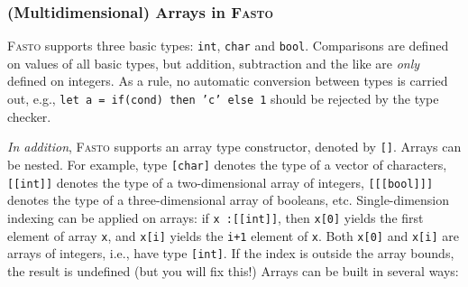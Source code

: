\documentclass[a4paper,11pt]{article}
\newcommand{\fasto}{\textsc{Fasto}\xspace}
\begin{document}
\subsubsection{(Multidimensional) Arrays in \fasto}


\fasto supports three basic types: {\tt int}, {\tt char} and {\tt bool}.
Comparisons are defined on values of all basic types, but addition, 
subtraction and the like are {\em only} defined on integers.
As a rule, %
no automatic conversion between types is carried out, e.g.,
{\tt let a = if(cond) then 'c' else 1}
should be rejected by the type checker.

{\em In addition}, \fasto supports an array type constructor, 
denoted by {\tt []}. Arrays can be nested. 
For example, type {\tt [char]} denotes the type of a
vector of characters,  {\tt [[int]]} denotes the type of a two-dimensional 
array of integers, {\tt [[[bool]]]} denotes the type of a
three-dimensional array of booleans, etc.  
%
Single-dimension indexing can be applied on arrays: if {\tt x :{}[[int]]},
then {\tt x[0]} yields the first element of array {\tt x}, and
{\tt x[i]} yields the {\tt i+1} element of {\tt x}. Both {\tt x[0]} and {\tt x[i]}
are arrays of integers, i.e., have type {\tt [int]}. If the index is outside
the array bounds, the result is undefined (but you will fix this!)
%
Arrays can be built in several ways: %
\end{document}
